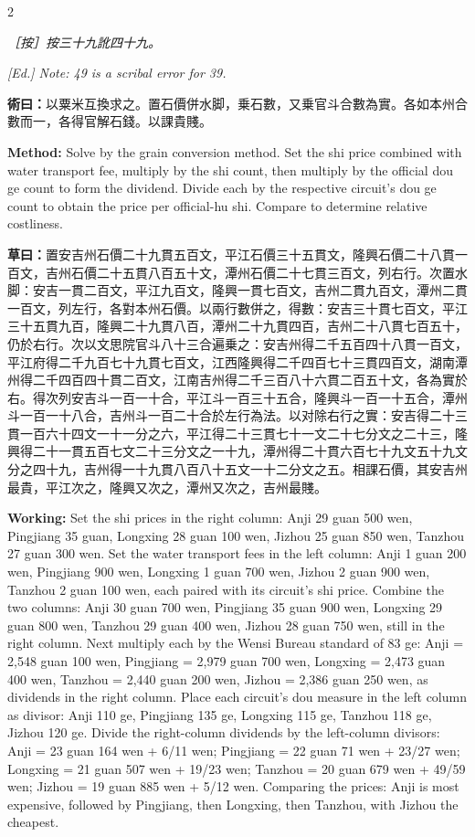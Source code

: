 \documentclass[11pt,a4paper]{article}
\newcommand{\MethodText}[1]{\par\noindent\textbf{\color{methodcolor}術曰：}#1\par}
\newcommand{\WorkingText}[1]{\par\noindent\textbf{草曰：}#1\par}
\newcommand{\EdNoteText}[1]{\par\noindent\textit{\color{ednotecolor}［按］#1}\par}
\newcommand{\MethodEn}[1]{\par\noindent\textbf{\color{methodcolor}Method:} #1\par}
\newcommand{\WorkingEn}[1]{\par\noindent\textbf{Working:} #1\par}
\newcommand{\EdNoteEn}[1]{\par\noindent\textit{\color{ednotecolor}[Ed.] #1}\par}
\begin{document}
\begin{paracol}{2}
\EdNoteText{按三十九訛四十九。}
\switchcolumn
\EdNoteEn{Note: 49 is a scribal error for 39.}
\switchcolumn*

\MethodText{以粟米互換求之。置石價併水脚，乗石數，又乗官斗合數為實。各如本州合數而一，各得官解石錢。以課貴賤。}
\switchcolumn
\MethodEn{Solve by the grain conversion method. Set the shi price combined with water transport fee, multiply by the shi count, then multiply by the official dou ge count to form the dividend. Divide each by the respective circuit's dou ge count to obtain the price per official-hu shi. Compare to determine relative costliness.}
\switchcolumn*

\WorkingText{置安吉州石價二十九貫五百文，平江石價三十五貫文，隆興石價二十八貫一百文，吉州石價二十五貫八百五十文，潭州石價二十七貫三百文，列右行。次置水脚：安吉一貫二百文，平江九百文，隆興一貫七百文，吉州二貫九百文，潭州二貫一百文，列左行，各對本州石價。以兩行數併之，得數：安吉三十貫七百文，平江三十五貫九百，隆興二十九貫八百，潭州二十九貫四百，吉州二十八貫七百五十，仍於右行。次以文思院官斗八十三合遍乗之：安吉州得二千五百四十八貫一百文，平江府得二千九百七十九貫七百文，江西隆興得二千四百七十三貫四百文，湖南潭州得二千四百四十貫二百文，江南吉州得二千三百八十六貫二百五十文，各為實於右。得次列安吉斗一百一十合，平江斗一百三十五合，隆興斗一百一十五合，潭州斗一百一十八合，吉州斗一百二十合於左行為法。以对除右行之實：安吉得二十三貫一百六十四文一十一分之六，平江得二十三貫七十一文二十七分文之二十三，隆興得二十一貫五百七文二十三分文之一十九，潭州得二十貫六百七十九文五十九文分之四十九，吉州得一十九貫八百八十五文一十二分文之五。相課石價，其安吉州最貴，平江次之，隆興又次之，潭州又次之，吉州最賤。}
\switchcolumn
\WorkingEn{Set the shi prices in the right column: Anji 29 guan 500 wen, Pingjiang 35 guan, Longxing 28 guan 100 wen, Jizhou 25 guan 850 wen, Tanzhou 27 guan 300 wen. Set the water transport fees in the left column: Anji 1 guan 200 wen, Pingjiang 900 wen, Longxing 1 guan 700 wen, Jizhou 2 guan 900 wen, Tanzhou 2 guan 100 wen, each paired with its circuit's shi price. Combine the two columns: Anji 30 guan 700 wen, Pingjiang 35 guan 900 wen, Longxing 29 guan 800 wen, Tanzhou 29 guan 400 wen, Jizhou 28 guan 750 wen, still in the right column. Next multiply each by the Wensi Bureau standard of 83 ge: Anji = 2,548 guan 100 wen, Pingjiang = 2,979 guan 700 wen, Longxing = 2,473 guan 400 wen, Tanzhou = 2,440 guan 200 wen, Jizhou = 2,386 guan 250 wen, as dividends in the right column. Place each circuit's dou measure in the left column as divisor: Anji 110 ge, Pingjiang 135 ge, Longxing 115 ge, Tanzhou 118 ge, Jizhou 120 ge. Divide the right-column dividends by the left-column divisors: Anji = 23 guan 164 wen + 6/11 wen; Pingjiang = 22 guan 71 wen + 23/27 wen; Longxing = 21 guan 507 wen + 19/23 wen; Tanzhou = 20 guan 679 wen + 49/59 wen; Jizhou = 19 guan 885 wen + 5/12 wen. Comparing the prices: Anji is most expensive, followed by Pingjiang, then Longxing, then Tanzhou, with Jizhou the cheapest.}
\switchcolumn*


\end{paracol}
\end{document}
